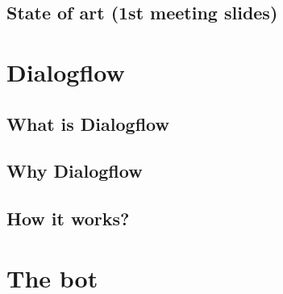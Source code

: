 \documentclass[a4paper,12pt]{report}
\begin{document}
	\section{State of art (1st meeting slides)}

\chapter{Dialogflow}
	\section{What is Dialogflow}
	\section{Why Dialogflow}
	\section{How it works?}

\chapter{The bot}
\end{document}
